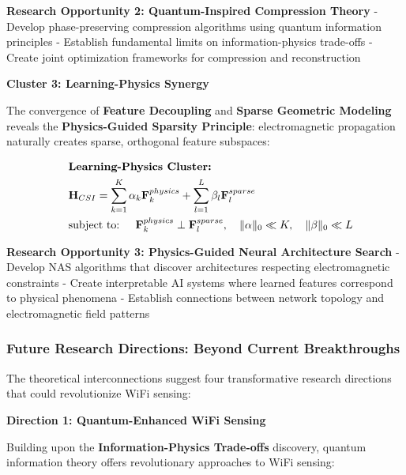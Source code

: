 \documentclass[journal]{IEEEtran}
\begin{document}
\textbf{Research Opportunity 2: Quantum-Inspired Compression Theory}
- Develop phase-preserving compression algorithms using quantum information principles
- Establish fundamental limits on information-physics trade-offs
- Create joint optimization frameworks for compression and reconstruction

\textbf{Cluster 3: Learning-Physics Synergy}

The convergence of \textbf{Feature Decoupling} and \textbf{Sparse Geometric Modeling} reveals the \textbf{Physics-Guided Sparsity Principle}: electromagnetic propagation naturally creates sparse, orthogonal feature subspaces:

\begin{align}
&\hspace{2em} \text{\textbf{Learning-Physics Cluster:}} \quad &  \nonumber \\
&\hspace{2em} \mathbf{H}_{CSI} = \sum_{k=1}^{K} \alpha_k \mathbf{F}_k^{physics} + \sum_{l=1}^{L} \beta_l \mathbf{F}_l^{sparse} \label{eq:physics_sparse_decomposition} \\
&\hspace{2em} \text{subject to: } \quad \mathbf{F}_k^{physics} \perp \mathbf{F}_l^{sparse}, \quad \|\alpha\|_0 \ll K, \quad \|\beta\|_0 \ll L \label{eq:orthogonal_sparse_constraints}
\end{align}

\textbf{Research Opportunity 3: Physics-Guided Neural Architecture Search}
- Develop NAS algorithms that discover architectures respecting electromagnetic constraints
- Create interpretable AI systems where learned features correspond to physical phenomena
- Establish connections between network topology and electromagnetic field patterns

\subsubsection{Future Research Directions: Beyond Current Breakthroughs}

The theoretical interconnections suggest four transformative research directions that could revolutionize WiFi sensing:

\textbf{Direction 1: Quantum-Enhanced WiFi Sensing}

Building upon the \textbf{Information-Physics Trade-offs} discovery, quantum information theory offers revolutionary approaches to WiFi sensing:
\end{document}

